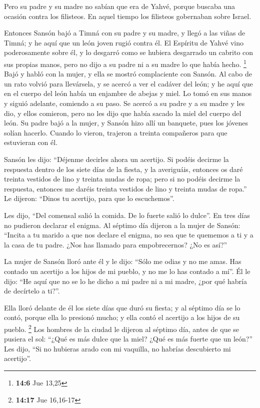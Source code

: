  Pero su padre y su madre no sabían que era de Yahvé,
porque buscaba una ocasión contra los filisteos. En aquel tiempo los
filisteos gobernaban sobre Israel.

 Entonces Sansón bajó a Timná con su padre y su madre, y
llegó a las viñas de Timná; y he aquí que un león joven rugió contra él.
 El Espíritu de Yahvé vino poderosamente sobre él, y lo
desgarró como se hubiera desgarrado un cabrito con sus propias manos,
pero no dijo a su padre ni a su madre lo que había hecho. \footnote{\textbf{14:6}
  Jue 13,25}  Bajó y habló con la mujer, y ella se mostró
complaciente con Sansón.  Al cabo de un rato volvió para
llevársela, y se acercó a ver el cadáver del león; y he aquí que en el
cuerpo del león había un enjambre de abejas y miel.  Lo
tomó en sus manos y siguió adelante, comiendo a su paso. Se acercó a su
padre y a su madre y les dio, y ellos comieron, pero no les dijo que
había sacado la miel del cuerpo del león.  Su padre bajó
a la mujer, y Sansón hizo allí un banquete, pues los jóvenes solían
hacerlo.  Cuando lo vieron, trajeron a treinta compañeros
para que estuvieran con él.

 Sansón les dijo: ``Déjenme decirles ahora un acertijo.
Si podéis decirme la respuesta dentro de los siete días de la fiesta, y
la averiguáis, entonces os daré treinta vestidos de lino y treinta mudas
de ropa;  pero si no podéis decirme la respuesta,
entonces me daréis treinta vestidos de lino y treinta mudas de ropa.''
Le dijeron: ``Dinos tu acertijo, para que lo escuchemos''.

 Les dijo, ``Del comensal salió la comida. De lo fuerte
salió lo dulce''. En tres días no pudieron declarar el enigma.
 Al séptimo día dijeron a la mujer de Sansón: ``Incita a
tu marido a que nos declare el enigma, no sea que te quememos a ti y a
la casa de tu padre. ¿Nos has llamado para empobrecernos? ¿No es así?''

 La mujer de Sansón lloró ante él y le dijo: ``Sólo me
odias y no me amas. Has contado un acertijo a los hijos de mi pueblo, y
no me lo has contado a mí''. Él le dijo: ``He aquí que no se lo he dicho
a mi padre ni a mi madre, ¿por qué habría de decírtelo a ti?''.

 Ella lloró delante de él los siete días que duró su
fiesta; y al séptimo día se lo contó, porque ella lo presionó mucho; y
ella contó el acertijo a los hijos de su pueblo. \footnote{\textbf{14:17}
  Jue 16,16-17}  Los hombres de la ciudad le dijeron al
séptimo día, antes de que se pusiera el sol: ``¿Qué es más dulce que la
miel? ¿Qué es más fuerte que un león?'' Les dijo, ``Si no hubieras arado
con mi vaquilla, no habrías descubierto mi acertijo''.

